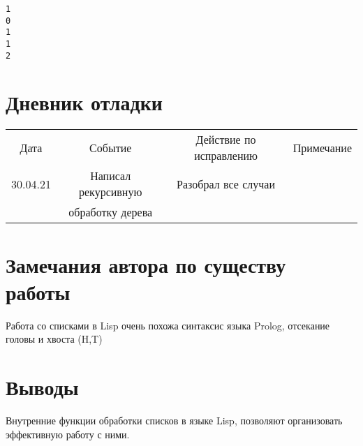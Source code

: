 \documentclass[15pt]{extarticle}
\begin{document}
\begin{lstlisting}
1 
0 
1 
1 
2
\end{lstlisting}

\section{Дневник отладки}

\begin{tabular}{|c|c|c|c|}
\hline
Дата     & Событие              & Действие по исправлению   & Примечание \\
30.04.21 & Написал рекурсивную    & Разобрал все случаи &            \\
         & обработку дерева &                           &            \\
\hline
\end{tabular}

\section{Замечания автора по существу работы}
Работа со списками в Lisp очень похожа синтаксис языка Prolog, отсекание головы и хвоста (H,T)

\section{Выводы}
Внутренние функции обработки списков в языке Lisp, позволяют организовать эффективную работу с ними.
\end{document}
